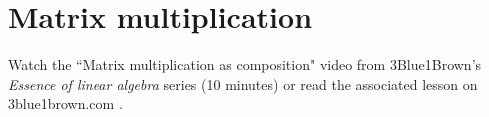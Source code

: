 \section{Matrix multiplication}

Watch the ``Matrix multiplication as composition" video from 3Blue1Brown's
\textit{Essence of linear algebra} series (10 minutes) or read the associated
lesson on 3blue1brown.com
\cite{bib:3b1b_linalg_matrix_multiplication_as_composition}.
